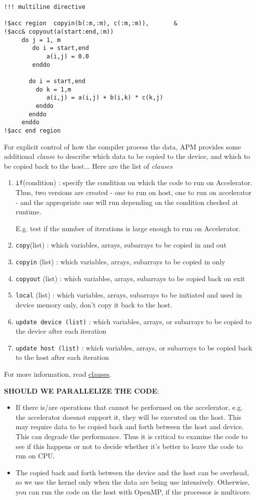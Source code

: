 \begin{lstlisting}
!!! multiline directive

!$acc region  copyin(b(:m,:m), c(:m,:m)),       &
!$acc& copyout(a(start:end,:m))
     do j = 1, m
        do i = start,end
            a(i,j) = 0.0
        enddo

       do i = start,end
         do k = 1,m
            a(i,j) = a(i,j) + b(i,k) * c(k,j)
         enddo
       enddo
     enddo
!$acc end region
\end{lstlisting}
For explicit control of how the compiler process the data, APM
provides some additional {\it clause} to describe which data to be
copied to the device, and which to be copied back to the host... Here
are the list of {\it clauses}
\begin{enumerate}
\item \verb!if!(condition) : specify the condition on which the code
  to run on Accelerator. Thus, two versions are created - one to run
  on host, one to run on accelerator - and the appropriate one will
  run depending on the condition checked at runtime.

E.g. test if the number of iterations is large enough to run on
Accelerator. 

\item \verb!copy!(list) : which variables, arrays, subarrays to be
  copied in and out
\item \verb!copyin! (list) : which variables, arrays, subarrays to be
  copied in only
\item \verb!copyout! (list) : which variables, arrays, subarrays to be
  copied back on exit
\item \verb!local! (list) : which variables, arrays, subarrays to be
  initiated and used in device memory only, don't copy it back to the
  host.
\item \verb!update device (list)! : which variables, arrays, or
  subarrays to be copied to the device after each iteration
\item \verb!update host (list)! : which variables, arrays, or
  subarrays to be copied back to the host after each iteration
\end{enumerate}
For more information, read \hyperref[sec:clauses]{clauses}.


{\bf SHOULD WE PARALLELIZE THE CODE}: 
\begin{itemize}
\item If there is/are operations that cannot be performed on the
  accelerator, e.g. the accelerator doesnot support it, they will be
  executed on the host. This may require data to be copied back and
  forth between the host and device. This can degrade the
  performance. Thus it is critical to examine the code to see if this
  happens or not to decide whether it's better to leave the code to
  run on CPU.

\item The copied back and forth between the device and the host can be
  overhead, so we use the kernel only when the data are being use
  intensively. Otherwise, you can run the code on the host with
  OpenMP, if the processor is multicore.
\end{itemize}

